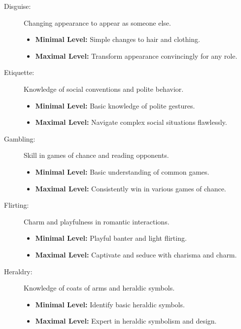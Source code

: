 \begin{description}
    \item[Disguise:] Changing appearance to appear as someone else.
        \begin{itemize}
            \item \textbf{Minimal Level:} Simple changes to hair and clothing.
            \item \textbf{Maximal Level:} Transform appearance convincingly for any role.
        \end{itemize}

    \item[Etiquette:] Knowledge of social conventions and polite behavior.
        \begin{itemize}
            \item \textbf{Minimal Level:} Basic knowledge of polite gestures.
            \item \textbf{Maximal Level:} Navigate complex social situations flawlessly.
        \end{itemize}

    \item[Gambling:] Skill in games of chance and reading opponents.
        \begin{itemize}
            \item \textbf{Minimal Level:} Basic understanding of common games.
            \item \textbf{Maximal Level:} Consistently win in various games of chance.
        \end{itemize}

    \item[Flirting:] Charm and playfulness in romantic interactions.
        \begin{itemize}
            \item \textbf{Minimal Level:} Playful banter and light flirting.
            \item \textbf{Maximal Level:} Captivate and seduce with charisma and charm.
        \end{itemize}

    \item[Heraldry:] Knowledge of coats of arms and heraldic symbols.
        \begin{itemize}
            \item \textbf{Minimal Level:} Identify basic heraldic symbols.
            \item \textbf{Maximal Level:} Expert in heraldic symbolism and design.
        \end{itemize}


\end{description}
